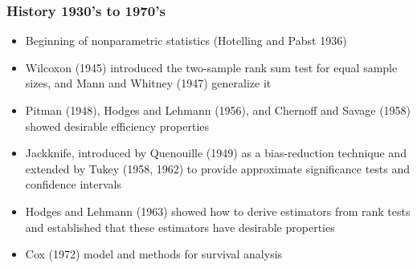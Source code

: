 \documentclass[10pt]{beamer}
\begin{document}
\begin{frame}
\frametitle{History 1930's to 1970's}

\begin{itemize}
\item Beginning of nonparametric statistics (Hotelling and Pabst 1936)
\item Wilcoxon (1945) introduced the two-sample rank sum test for equal sample sizes, and Mann and Whitney (1947) generalize it
\item Pitman (1948), Hodges and Lehmann (1956), and Chernoff and Savage (1958) showed desirable efficiency properties
\item Jackknife, introduced by Quenouille (1949) as a bias-reduction technique and extended by Tukey (1958, 1962) to provide approximate significance tests and confidence intervals
\item Hodges and Lehmann (1963) showed how to derive estimators from rank tests and established that these estimators have desirable properties
\item Cox (1972) model and methods for survival analysis
\end{itemize}

\end{frame}
\end{document}

